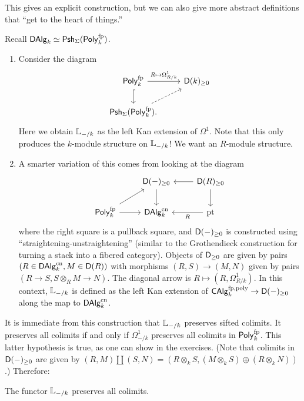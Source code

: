 \documentclass{amsart}
\begin{document}
This gives an explicit construction, but we can also give more abstract definitions that ``get to the heart of things.''

\begin{cons}
	Recall $\mathsf{DAlg}_k \simeq \mathsf{Psh}_\Sigma(\mathsf{Poly}^{\mathrm{fp}}_k)$.
	\begin{enumerate}
		\item Consider the diagram
			\[
				\begin{tikzcd}
					\Polyfp_k \rar["R \mapsto \Omega^1_{R/k}"] \dar[hook] & \Dsf(k)_{\geq 0} \\
					\Psh_\Sigma(\Polyfp_k). \ar[ur, dashed]
				\end{tikzcd}
			\]
			Here we obtain $\mathbb{L}_{-/k}$ as the left Kan extension of $\Omega^1$.
			Note that this only produces the $k$-module structure on $\mathbb{L}_{-/k}$!
			We want an $R$-module structure.
		\item A smarter variation of this comes from looking at the diagram
			\[
				\begin{tikzcd}
					& \Dsf(-)_{\geq 0} \dar & \Dsf(R)_{\geq 0} \lar \dar \\
					\Polyfp_k \ar[ur] \rar & \DAlg_k\cn & \pt \lar["R"]
				\end{tikzcd}
			\]
			where the right square is a pullback square, and $\mathsf{D}(-)_{\geq 0}$ is constructed using ``straightening-unstraightening'' (similar to the Grothendieck construction for turning a stack into a fibered category).
			Objects of $\mathsf{D}_{\geq 0}$ are given by pairs $(R \in \mathsf{DAlg}_k^{\mathrm{cn}}, M \in \mathsf{D}(R))$ with morphisms $(R, S) \to (M, N)$ given by pairs $(R \to S, S \otimes_R M \to N)$.
			The diagonal arrow is $R \mapsto (R, \Omega^1_{R/k})$.
			In this context, $\mathbb{L}_{-/k}$ is defined as the left Kan extension of $\mathsf{CAlg}_k^{\mathrm{fp,poly}} \to \mathsf{D}(-)_{\geq 0}$ along the map to $\mathsf{DAlg}_k^{\mathrm{cn}}$.
	\end{enumerate}
\end{cons}

It is immediate from this construction that $\mathbb{L}_{-/k}$ preserves sifted colimits.
It preserves all colimits if and only if $\Omega^1_{-/k}$ preserves all colimits in $\mathsf{Poly}^{\mathrm{fp}}_k$.
This latter hypothesis is true, as one can show in the exercises.
(Note that colimits in $\mathsf{D}(-)_{\geq 0}$ are given by $(R, M) \coprod (S, N) = (R \otimes_k S, (M \otimes_k S) \oplus (R \otimes_k N))$.)
Therefore:

\begin{prop}
	The functor $\mathbb{L}_{-/k}$ preserves all colimits.
\end{prop}
\end{document}
